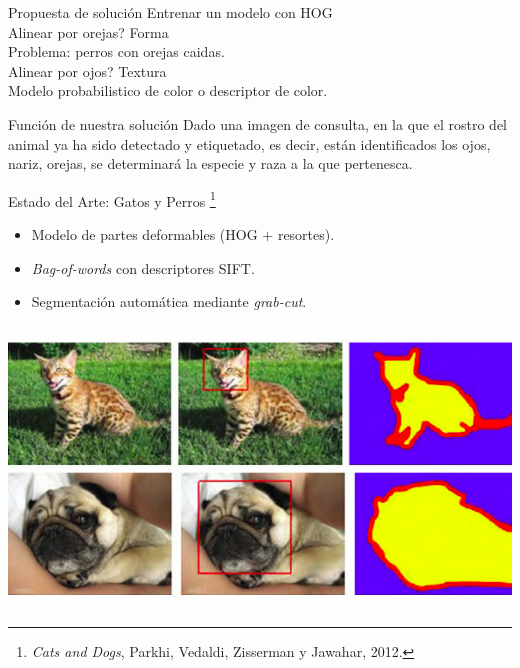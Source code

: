 \documentclass{beamer}
\begin{document}
	\begin{frame}{Propuesta de solución}
		Entrenar un modelo con HOG\\
		Alinear por orejas? Forma\\
		Problema: perros con orejas caidas.\\
		Alinear por ojos? Textura\\
		Modelo probabilistico de color o descriptor de color.
	\end{frame}
	\begin{frame}{Función de nuestra solución}
		Dado una imagen de consulta, en la que el rostro del animal ya ha sido detectado y etiquetado, es decir, están identificados los ojos, nariz, orejas, se determinará la especie y raza a la que pertenesca. 
	\end{frame}

    \begin{frame}{Estado del Arte: Gatos y Perros \footnote{\emph{Cats and
        Dogs}, Parkhi, Vedaldi, Zisserman y Jawahar, 2012.}}
        \begin{itemize}
            \item Modelo de partes deformables (HOG + resortes).
            \item \emph{Bag-of-words} con descriptores SIFT. 
            \item Segmentación automática mediante \emph{grab-cut}.
        \end{itemize}
        \begin{center}
            \includegraphics[scale=0.3]{imagen/catsanddogs_annotation}
        \end{center}
	\end{frame}
\end{document}
